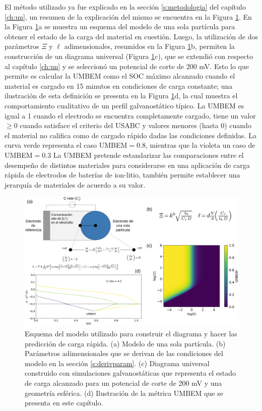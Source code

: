 El método utilizado ya fue explicado en la sección \ref{s:metodologia} del
capítulo \ref{ch:un}, un resumen de la explicación del mismo se encuentra 
en la Figura \ref{fig:explicacion}. En la Figura \ref{fig:explicacion}a se 
muestra un esquema del modelo de una sola partícula para obtener el estado
de la carga del material en cuestión. Luego, la utilización de dos parámetros
$\Xi$ y $\ell$ adimensionales, resumidos en la Figura \ref{fig:explicacion}b,
permiten la construcción de un diagrama universal (Figura 
\ref{fig:explicacion}c), que se extendió con respecto al capítulo \ref{ch:un}
y se seleccionó un potencial de corte de 200 mV. Esto lo que permite es 
calcular la UMBEM como el SOC máximo alcanzado cuando el material es cargado
en 15 minutos en condiciones de carga constante; una ilustración de esta 
definición se presenta en la Figura \ref{fig:explicacion}d, la cual muestra 
el comportamiento cualitativo de un perfil galvanostático típico. La UMBEM
es igual a 1 cuando el electrodo se encuentra completamente cargado, tiene
un valor $\geq 0$ cuando satisface el criterio del USABC \cite{USABC} y
valores menores (hasta 0) cuando el material no califica como de cargado 
rápido dadas las condiciones definidas. La curva verde representa el caso 
UMBEM$ = 0.8$, mientras que la violeta un caso de UMBEM$ = 0.3$ La UMBEM 
pretende estandarizar las comparaciones entre el desempeño de distintos 
materiales para considerarse en una aplicación de carga rápida de electrodos
de baterías de ion-litio, también permite establecer una jerarquía de 
materiales de acuerdo a su valor.
\begin{figure}[h!]
    \centering
    \includegraphics[width=\textwidth]{FastCharging/umbem/explicacion/explicacion.png}
    \caption{Esquema del modelo utilizado para construir el diagrama y hacer 
    las predicción de carga rápida. (a) Modelo de una sola partícula. (b) 
    Parámetros adimensionales que se derivan de las condiciones del modelo 
    en la sección \ref{s:derivparam}. (c) Diagrama universal construido con 
    simulaciones galvanostáticas que representa el estado de carga alcanzado para 
    un potencial de corte de 200 mV y una geometría esférica. (d) Ilustración
    de la métrica UMBEM que se presenta en este capítulo.}
    \label{fig:explicacion}
\end{figure}

